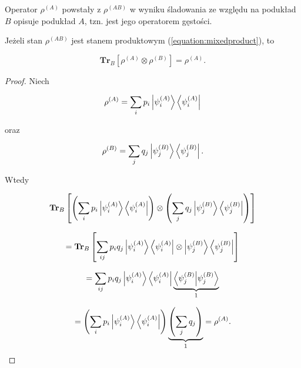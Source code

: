 Operator $\rho ^ {(A)}$ powstały z $\rho ^ {(AB)}$ w wyniku śladowania ze względu na podukład $B$ opisuje podukład $A$, tzn. jest jego operatorem gęstości.

\begin{fact}
    Jeżeli stan $\rho ^ {(AB)}$ jest stanem produktowym (\ref{equation:mixedproduct}), to

    \begin{equation}
        \textbf{Tr}_B[\rho ^ {(A)} \otimes \rho ^ {(B)}] = \rho ^ {(A)}.
    \end{equation}
\end{fact}

\begin{proof}
    Niech

    $$
        \rho ^ {(A)} = \sum\limits_{i} p_{i} \ket{\psi_{i} ^ {(A)}} \bra{\psi_{i}^{(A)}}
    $$

    oraz

    $$
        \rho ^ {(B)} = \sum\limits_{j} q_{j} \ket{\psi_{j}^{(B)}} \bra{\psi_{j}^{(B)}}.
    $$

    Wtedy

    $$
        \textbf{Tr}_B\left[\left(\sum\limits_{i} p_{i} \ket{\psi_{i}^{(A)}} \bra{\psi_{i}^{(A)}}\right) \otimes \left(\sum\limits_{j} q_{j} \ket{\psi_{j}^{(B)}} \bra{\psi_{j}^{(B)}}\right)\right]
    $$

    $$
        = \textbf{Tr}_B\left[\sum\limits_{ij} p_{i} q_{j} \ket{\psi_{i}^{(A)}} \bra{\psi_{i}^{(A)}} \otimes \ket{\psi_{j}^{(B)}} \bra{\psi_{j}^{(B)}}\right]
    $$

    $$
        = \sum\limits_{ij} p_{i} q_{j} \ket{\psi_{i}^{(A)}} \bra{\psi_{i}^{(A)}} \underbrace{\bra{\psi_{j}^{(B)}}\ket{\psi_{j}^{(B)}}}_{1}
    $$

    $$
        = \left(\sum\limits_{i} p_{i} \ket{\psi_{i}^{(A)}} \bra{\psi_{i}^{(A)}}\right) \underbrace{\left(\sum\limits_{j} q_{j}\right)}_{1} = \rho ^ {(A)}.
    $$
\end{proof}

















